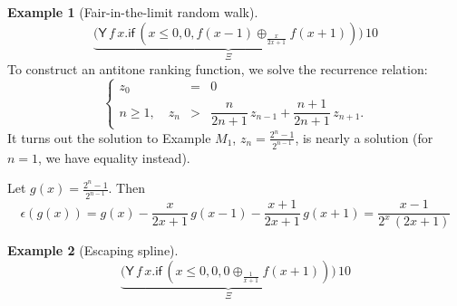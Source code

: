 \documentclass{article}
\newcommand{\tY}{\textsf{Y}}
\newcommand{\tif}[3]{\textsf{if}\,(#1, #2, #3)} %
\theoremstyle{definition}
\newtheorem{example}{Example}
\theoremstyle{lemma}
\theoremstyle{remark}
\begin{document}
\begin{example}[Fair-in-the-limit random walk]
\label{ex:Fair-in-the-limit random walk}\citep[\S 5.3]{DBLP:journals/pacmpl/McIverMKK18}
\[
\underbrace{\big
(\tY \, f \, x . 
\tif{x \leq 0}{0}{f(x - 1) \oplus_{\frac{x}{2x+1}} f(x + 1)} \big)}_{\Xi} 
\, 10
\]
To construct an antitone ranking function, we solve the recurrence relation:
\[
\left\{
\begin{array}{rll}
z_0 &=& 0\\
n \geq 1, \quad z_n &>& \dfrac{n}{2n + 1} \, z_{n-1} + \dfrac{n+1}{2n + 1} \, z_{n+1}.
\end{array}
\right.
\]
It turns out the solution to Example $M_1$, $z_n = \frac{2^n - 1}{2^{n-1}}$, is nearly a solution (for $n = 1$, we have equality instead). 

Let $g(x) = \frac{2^n - 1}{2^{n-1}}$.
Then 
\begin{equation}
\epsilon(g(x)) = 
g(x) - \dfrac{x}{2x + 1} \, g(x-1) - \dfrac{x+1}{2x + 1} \, g(x+1) 
= \dfrac{x-1}{2^{x} \, (2x + 1)}
\label{eqn:in the limit}
\end{equation}


\end{example}

\begin{example}[Escaping spline]
\label{ex:escaping spline}\citep[\S 5.4]{DBLP:journals/pacmpl/McIverMKK18}
\[
\underbrace{\big
(\tY \, f \, x . 
\tif{x \leq 0}{0}{0 \oplus_{\frac{1}{x+1}} f(x + 1)} \big)}_{\Xi} 
\, 10
\]
\end{example}







\end{document}
